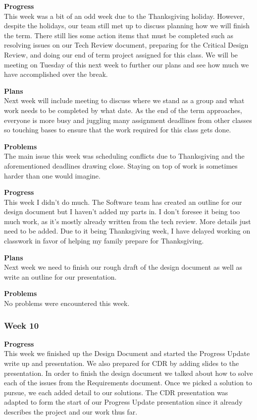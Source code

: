 \textbf{Progress} \\
This week was a bit of an odd week due to the Thanksgiving holiday. However, despite the holidays, our team still met 
up to discuss planning how we will finish the term. There still lies some action items that must be completed such as 
resolving issues on our Tech Review document, preparing for the Critical Design Review, and doing our end of term 
project assigned for this class. We will be meeting on Tuesday of this next week to further our plans and see how 
much we have accomplished over the break.

\textbf{Plans} \\
Next week will include meeting to discuss where we stand as a group and what work needs to be completed by what date.
As the end of the term approaches, everyone is more busy and juggling many assignment deadlines from other classes
so touching bases to ensure that the work required for this class gets done.

\textbf{Problems} \\
The main issue this week was scheduling conflicts due to Thanksgiving and the aforementioned deadlines drawing
close. Staying on top of work is sometimes harder than one would imagine.

\textbf{Progress} \\
This week I didn't do much. The Software team has created an outline for our design document but I haven't added my parts in. I don't foresee it being too much work, as it's mostly already written from the tech review. More details just need to be added. Due to it being Thanksgiving week, I have delayed working on classwork in favor of helping my family prepare for Thanksgiving.

\textbf{Plans} \\
Next week we need to finish our rough draft of the design document as well as write an outline for our presentation.

\textbf{Problems} \\
No problems were encountered this week.

\subsubsection{Week 10}
\textbf{Progress} \\ 
This week we finished up the Design Document and started the Progress Update write up and presentation. We also prepared for CDR by adding slides to the presentation. In order to finish the design document we talked about how to solve each of the issues from the Requirements document. Once we picked a solution to pursue, we each added detail to our solutions. The CDR presentation was adapted to form the start of our Progress Update presentation since it already describes the project and our work thus far.

